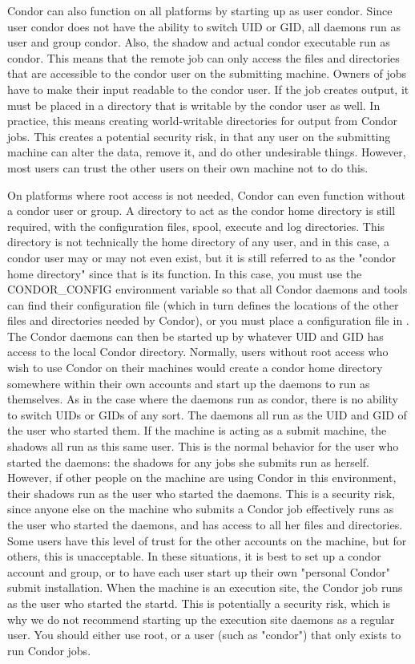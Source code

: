 Condor can also function on all platforms by starting up as
user condor.  Since user condor does not have the ability to switch
UID or GID, all daemons run as user and group condor.  Also, the
shadow and actual condor executable run as condor.  This means that
the remote job can only access the files and directories that are
accessible to the condor user on the submitting machine.  Owners of
jobs have to make their input readable to the condor user.  If the job
creates output, it must be placed in a directory that is writable by
the condor user as well.  In practice, this means creating
world-writable directories for output from Condor jobs.  This creates
a potential security risk, in that any user on the submitting machine
can alter the data, remove it, and do other undesirable things.
However, most users can trust the other users on their own machine not
to do this.

On platforms where root access is not needed, Condor can even function
without a condor user or group.  A directory to act as the condor home
directory is still required, with the configuration files, spool,
execute and log directories.  This directory is not technically the
home directory of any user, and in this case, a condor user may or may
not even exist, but it is still referred to as the "condor home
directory" since that is its function.  In this case, you must use the
CONDOR\_CONFIG environment variable so that all Condor daemons and
tools can find their configuration file (which in turn defines the
locations of the other files and directories needed by Condor), or you
must place a configuration file in .  The
Condor daemons can then be started up by whatever UID and GID has
access to the local Condor directory.  Normally, users without root
access who wish to use Condor on their machines would create a condor
home directory somewhere within their own accounts and start up the
daemons to run as themselves.  As in the case where the daemons run as
condor, there is no ability to switch UIDs or GIDs of any sort.  The
daemons all run as the UID and GID of the user who started them.  If
the machine is acting as a submit machine, the shadows all run as this
same user.  This is the normal behavior for the user who started the
daemons: the shadows for any jobs she submits run as herself.
However, if other people on the machine are using Condor in this
environment, their shadows run as the user who started the daemons.
This is a security risk, since anyone else on the machine who submits
a Condor job effectively runs as the user who started the daemons, and
has access to all her files and directories.  Some users have this
level of trust for the other accounts on the machine, but for others,
this is unacceptable.  In these situations, it is best to set up a
condor account and group, or to have each user start up their own
"personal Condor" submit installation.  When the machine is an
execution site, the Condor job runs as the user who started the
startd.  This is potentially a security risk, which is why we do not
recommend starting up the execution site daemons as a regular user.
You should either use root, or a user (such as "condor") that only
exists to run Condor jobs.

